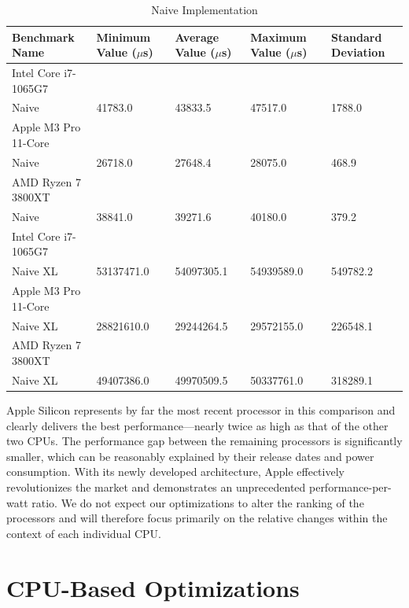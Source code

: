 \documentclass[modern,longauthor]{aastex7}
\begin{document}
\begin{table}[htb!]
\centering
\caption{Naive Implementation\label{tab:naive}}
\begin{tabular}{p{5cm} p{2cm} p{2cm} p{2cm} p{2cm}}
\hline
Benchmark Name & Minimum Value ($\mu$s) & Average Value ($\mu$s) & Maximum Value ($\mu$s) & Standard Deviation \\
\hline
Intel Core i7-1065G7 \\
\hspace{0.5cm}Naive & 41783.0 & 43833.5 & 47517.0 & 1788.0 \\
Apple M3 Pro 11-Core \\
\hspace{0.5cm}Naive & 26718.0 & 27648.4 & 28075.0 & 468.9 \\
AMD Ryzen 7 3800XT \\
\hspace{0.5cm}Naive & 38841.0 & 39271.6 & 40180.0 & 379.2 \\
\hline
Intel Core i7-1065G7 \\
\hspace{0.5cm}Naive XL & 53137471.0 & 54097305.1 & 54939589.0 & 549782.2 \\
Apple M3 Pro 11-Core \\
\hspace{0.5cm}Naive XL & 28821610.0 & 29244264.5 & 29572155.0 & 226548.1 \\
AMD Ryzen 7 3800XT \\
\hspace{0.5cm}Naive XL & 49407386.0 & 49970509.5 & 50337761.0 & 318289.1 \\
\hline
\end{tabular}
\end{table}
\FloatBarrier

Apple Silicon represents by far the most recent processor in this comparison and clearly delivers the best performance—nearly twice as high as that of the other two CPUs. The performance gap between the remaining processors is significantly smaller, which can be reasonably explained by their release dates and power consumption. With its newly developed architecture, Apple effectively revolutionizes the market and demonstrates an unprecedented performance-per-watt ratio. We do not expect our optimizations to alter the ranking of the processors and will therefore focus primarily on the relative changes within the context of each individual CPU.
\section{CPU-Based Optimizations}\label{sec:cpu-based-optimizations}
\end{document}

